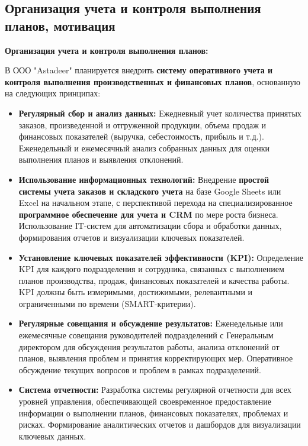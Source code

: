     \subsection{Организация учета и контроля выполнения планов, мотивация}

    \textbf{Организация учета и контроля выполнения планов:}

    В ООО "Astadeer" планируется внедрить \textbf{систему оперативного учета и контроля выполнения производственных и финансовых планов}, основанную на следующих принципах:

    \begin{itemize}
        \item \textbf{Регулярный сбор и анализ данных:}  Ежедневный учет количества принятых заказов, произведенной и отгруженной продукции, объема продаж и финансовых показателей (выручка, себестоимость, прибыль и т.д.).  Еженедельный и ежемесячный анализ собранных данных для оценки выполнения планов и выявления отклонений.
        \item \textbf{Использование информационных технологий:}  Внедрение \textbf{простой системы учета заказов и складского учета} на базе Google Sheets или Excel на начальном этапе, с перспективой перехода на специализированное \textbf{программное обеспечение для учета и CRM} по мере роста бизнеса.  Использование IT-систем для автоматизации сбора и обработки данных, формирования отчетов и визуализации ключевых показателей.
        \item \textbf{Установление ключевых показателей эффективности (KPI):}  Определение KPI для каждого подразделения и сотрудника, связанных с выполнением планов производства, продаж, финансовых показателей и качества работы.  KPI должны быть измеримыми, достижимыми, релевантными и ограниченными по времени (SMART-критерии).
        \item \textbf{Регулярные совещания и обсуждение результатов:}  Еженедельные или ежемесячные совещания руководителей подразделений с Генеральным директором для обсуждения результатов работы, анализа отклонений от планов, выявления проблем и принятия корректирующих мер.  Оперативное обсуждение текущих вопросов и проблем в рамках подразделений.
        \item \textbf{Система отчетности:}  Разработка системы регулярной отчетности для всех уровней управления, обеспечивающей своевременное предоставление информации о выполнении планов, финансовых показателях, проблемах и рисках.  Формирование аналитических отчетов и дашбордов для визуализации ключевых данных.
    \end{itemize}

